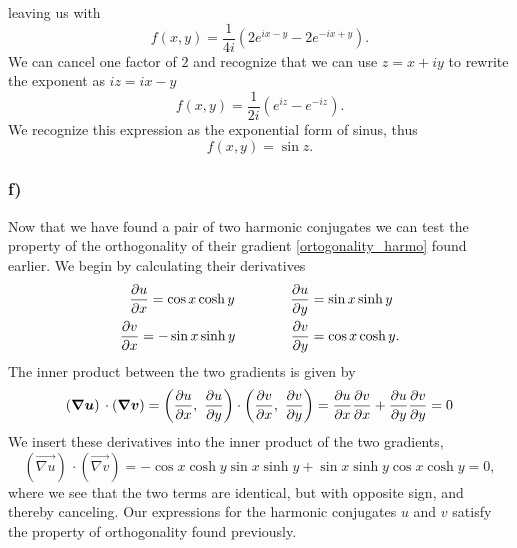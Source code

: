 \documentclass[12pt,twoside]{article}
\begin{document}
leaving us with
\begin{equation}
  f(x, y) = \frac{1}{4i}\left(2e^{ix-y} - 2e^{-ix+y}\right).
\end{equation}
We can cancel one factor of $2$ and recognize that we can use $z=x+iy$ to rewrite the exponent as $iz=ix-y$
\begin{equation}
  f(x, y) = \frac{1}{2i}\left(e^{iz} - e^{-iz}\right).
\end{equation}
We recognize this expression as the exponential form of sinus, thus
\begin{equation}
  f(x, y) = \sin{z}.
\end{equation}

\subsubsection*{f)}
Now that we have found a pair of two harmonic conjugates we can test the property of the orthogonality of their gradient \eqref{ortogonality_harmo} found earlier. We begin by calculating their derivatives
\begin{align}
  \begin{split}
  \pdv{u}{x} = \cos{x}\cosh{y}\qquad \qquad\pdv{u}{y} &= \sin{x}\sinh{y} \\
  \pdv{v}{x} = -\sin{x}\sinh{y}\qquad \qquad\pdv{v}{y} &= \cos{x}\cosh{y}. \label{derivatives_2}
\end{split}
\end{align}
The inner product between the two gradients is given by
\begin{equation}
  \left( {\boldsymbol{{ \nabla u}}} \right) \,\cdot   \left( {\boldsymbol{{ \nabla v}}} \right) = \left( \pdv{u}{x}, \,\, \pdv{u}{y} \right)\cdot \left( \pdv{v}{x}, \,\, \pdv{v}{y} \right) = \pdv{u}{x}\pdv{v}{x} + \pdv{u}{y}\pdv{v}{y} = 0
\end{equation}
We insert these derivatives into the inner product of the two gradients,
\begin{equation}
  \left( \vec{ \nabla u} \right) \,\cdot   \left( \vec{ \nabla v} \right) = -\cos{x}\cosh{y}\sin{x}\sinh{y} + \sin{x}\sinh{y}\cos{x}\cosh{y} = 0,
\end{equation}
where we see that the two terms are identical, but with opposite sign, and thereby canceling. Our expressions for the harmonic conjugates $u$ and $v$ satisfy the property of orthogonality found previously.
\end{document}
